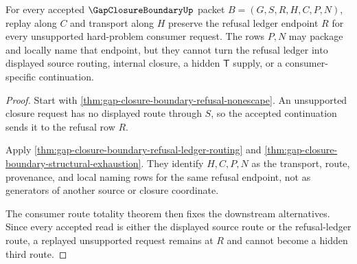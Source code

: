 \begin{theorem}
\label{thm:gap-closure-boundary-refusal-ledger-stability}
For every accepted $\GapClosureBoundaryUp$ packet $B=(G,S,R,H,C,P,N)$, replay along $C$ and transport along $H$ preserve the refusal ledger endpoint $R$ for every unsupported hard-problem consumer request. The rows $P,N$ may package and locally name that endpoint, but they cannot turn the refusal ledger into displayed source routing, internal closure, a hidden $\mathsf{T}$ supply, or a consumer-specific continuation.
\end{theorem}
\begin{proof}
Start with \autoref{thm:gap-closure-boundary-refusal-nonescape}. An unsupported closure request has no displayed route through $S$, so the accepted continuation sends it to the refusal row $R$.

Apply \autoref{thm:gap-closure-boundary-refusal-ledger-routing} and \autoref{thm:gap-closure-boundary-structural-exhaustion}. They identify $H,C,P,N$ as the transport, route, provenance, and local naming rows for the same refusal endpoint, not as generators of another source or closure coordinate.

The consumer route totality theorem then fixes the downstream alternatives. Since every accepted read is either the displayed source route or the refusal-ledger route, a replayed unsupported request remains at $R$ and cannot become a hidden third route.
\end{proof}
